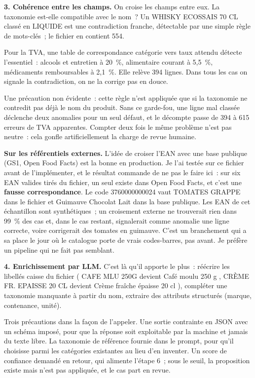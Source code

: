 \documentclass[11pt,a4paper]{article}
\begin{document}
\textbf{3. Cohérence entre les champs.} On croise les champs entre eux. La taxonomie est-elle
compatible avec le nom~? Un \guillemotleft{} WHISKY ECOSSAIS 70 CL \guillemotright{} classé en LIQUIDE est une contradiction
franche, détectable par une simple règle de mots-clés~; le fichier en contient 554.

Pour la TVA, une table de correspondance catégorie vers taux attendu détecte
l'essentiel~: alcools et entretien à 20~\%, alimentaire courant à 5,5~\%, médicaments remboursables
à 2,1~\%. Elle relève 394 lignes. Dans tous les cas on signale la contradiction, on ne la corrige
pas en douce.

Une précaution non évidente~: cette règle n'est appliquée que si la taxonomie ne contredit pas
déjà le nom du produit. Sans ce garde-fou, une ligne mal classée déclenche deux anomalies pour un
seul défaut, et le décompte passe de 394 à 615 erreurs de TVA apparentes. Compter deux fois le même
problème n'est pas neutre~: cela gonfle artificiellement la charge de revue humaine.

\textbf{Sur les référentiels externes.} L'idée de croiser l'EAN avec une base publique (GS1, Open
Food Facts) est la bonne en production. Je l'ai testée sur ce fichier avant de l'implémenter, et le
résultat commande de ne pas le faire ici~: sur six EAN valides tirés du fichier, un seul existe dans
Open Food Facts, et c'est une \textbf{fausse correspondance}. Le code 3760000000024 vaut \guillemotleft{} TOMATES
GRAPPE \guillemotright{} dans le fichier et \guillemotleft{} Guimauve Chocolat Lait \guillemotright{} dans la base publique. Les EAN de cet
échantillon sont synthétiques~; un croisement externe ne trouverait rien dans 99~\% des cas et,
dans le cas restant, signalerait comme anomalie une ligne correcte, voire \guillemotleft{} corrigerait \guillemotright{} des
tomates en guimauve. C'est un branchement qui a sa place le jour où le catalogue porte de vrais
codes-barres, pas avant. Je préfère un pipeline qui ne fait pas semblant.

\textbf{4. Enrichissement par LLM.} C'est là qu'il apporte le plus~: réécrire les libellés caisse
du fichier (\guillemotleft{} CAFE MLU 250G \guillemotright{} devient \guillemotleft{} Café moulu 250 g \guillemotright{}, \guillemotleft{} CRÈME FR. EPAISSE 20 CL \guillemotright{} devient
\guillemotleft{} Crème fraîche épaisse 20 cl \guillemotright{}), compléter une taxonomie manquante à
partir du nom, extraire des attributs structurés (marque, contenance, unité).

Trois précautions dans la façon de l'appeler. Une sortie contrainte en JSON
avec un schéma imposé, pour que la réponse soit exploitable par la machine et jamais du texte
libre. La taxonomie de référence fournie dans le prompt, pour qu'il choisisse parmi les catégories
existantes au lieu d'en inventer. Un score de confiance demandé en retour, qui alimente l'étape 6~;
sous le seuil, la proposition existe mais n'est pas appliquée, et le cas part en revue.
\end{document}
